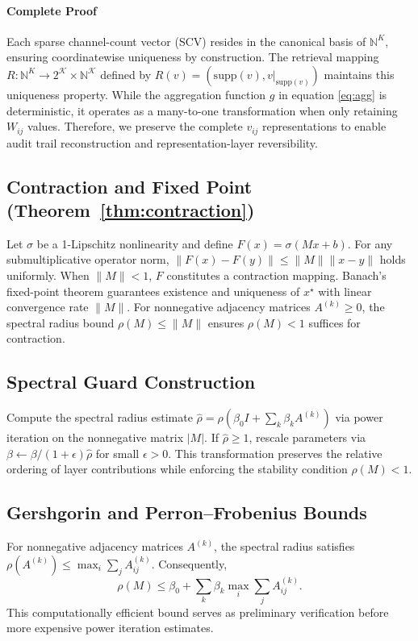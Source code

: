 \documentclass[12pt]{article}
\theoremstyle{plain}
\begin{document}
\paragraph{Complete Proof}
Each sparse channel-count vector (SCV) resides in the canonical basis of $\mathbb{N}^K$, ensuring coordinatewise uniqueness by construction. The retrieval mapping $R: \mathbb{N}^K \to 2^{\mathcal{K}} \times \mathbb{N}^{\mathcal{K}}$ defined by $R(v)=(\mathrm{supp}(v),v|_{\mathrm{supp}(v)})$ maintains this uniqueness property. While the aggregation function $g$ in equation \eqref{eq:agg} is deterministic, it operates as a many-to-one transformation when only retaining $W_{ij}$ values. Therefore, we preserve the complete $v_{ij}$ representations to enable audit trail reconstruction and representation-layer reversibility.

\subsection{Contraction and Fixed Point (Theorem~\ref{thm:contraction})}
Let $\sigma$ be a 1-Lipschitz nonlinearity and define $F(x)=\sigma(Mx+b)$. For any submultiplicative operator norm, $\|F(x)-F(y)\|\le\|M\|\|x-y\|$ holds uniformly. When $\|M\|<1$, $F$ constitutes a contraction mapping. Banach's fixed-point theorem guarantees existence and uniqueness of $x^\star$ with linear convergence rate $\|M\|$. For nonnegative adjacency matrices $A^{(k)}\ge0$, the spectral radius bound $\rho(M)\le\|M\|$ ensures $\rho(M)<1$ suffices for contraction.

\subsection{Spectral Guard Construction}
\label{app:spectral-guard}
Compute the spectral radius estimate $\widehat{\rho}=\rho\!\left(\beta_0 I+\sum_k \beta_k A^{(k)}\right)$ via power iteration on the nonnegative matrix $|M|$. If $\widehat{\rho}\ge 1$, rescale parameters via $\beta\leftarrow\beta/(1+\epsilon)\widehat{\rho}$ for small $\epsilon>0$. This transformation preserves the relative ordering of layer contributions while enforcing the stability condition $\rho(M)<1$.

\subsection{Gershgorin and Perron–Frobenius Bounds}
For nonnegative adjacency matrices $A^{(k)}$, the spectral radius satisfies $\rho(A^{(k)})\le \max_i \sum_j A^{(k)}_{ij}$. Consequently,
\[
\rho(M)\le \beta_0+\sum_k \beta_k \max_i \sum_j A^{(k)}_{ij}.
\]
This computationally efficient bound serves as preliminary verification before more expensive power iteration estimates.
\end{document}
